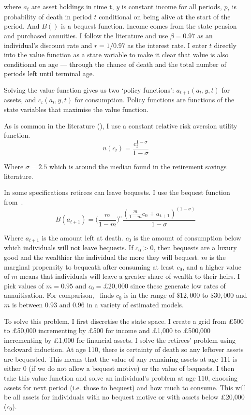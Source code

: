 \documentclass[12pt]{article}
\begin{document}
where $a_{t}$ are asset holdings in time t, $y$ is constant income for all
periods, $p_{t}$ is probability of death in period $t$ conditional on being
alive at the start of the period. And $B()$ is a bequest function. Income comes
from the state pension and purchased annuities. I follow the literature and use
$\beta = 0.97$ as an individual's discount rate and $r = 1/0.97$ as the interest
rate. I enter $t$ directly into the value function as a state variable to make
it clear that value is also conditional on age --- through the chance of death
and the total number of periods left until terminal age.

Solving the value function gives us two `policy functions': $a_{t+1}(a_{t},
  y,t)$ for assets, and $c_{t}(a_{t}, y, t)$ for consumption. Policy
functions are functions of the state variables that maximise the value function.

As is common in the literature (\cite{lockwood-red-2012,de-nardi-et-al-2010}), I
use a constant relative risk aversion utility function.
\begin{equation*}
  \label{eq:utility}
  u(c_{t}) = \frac{c_{t}^{1 - \sigma}}{1 - \sigma}
\end{equation*}

Where $\sigma = 2.5$ which is around the median found in the retirement savings
literature.

In some specifications retirees can leave bequests. I use the bequest function
from~\cite{lockwood-red-2012,lockwood-aer-2018}.
\begin{equation*}
  \label{eq:bequest-function}
  B(a_{t+1}) = \bigl( \frac{m}{1 - m} \bigr)^{\sigma}  \frac{(\frac{m}{1 - m}c_{0} + a_{t+1})^{(1 - \sigma)}}{1 - \sigma}
\end{equation*}

Where $a_{t+1}$ is the amount left at death. $c_{0}$ is the amount of
consumption below which individuals will not leave bequests. If $c_{0} >0$, then
bequests are a luxury good and the wealthier the individual the more they will
bequest. $m$ is the marginal propensity to bequeath after consuming at least
$c_{0}$, and a higher value of $m$ means that individuals will leave a greater
share of wealth to their heirs. I pick values of $m = 0.95$ and $c_{0} = \pounds
  20,000$ since these generate low rates of annuitisation. For comparison,~\cite{lockwood-aer-2018} finds $c_{0}$ is in the range of $\$12,000$ to
$\$30,000$ and $m$ is between $0.93$ and $0.96$ in a variety of estimated
models.

To solve this problem, I first discretise the state space. I create a grid from £500
to £50,000 incrementing by £500 for income and £1,000 to £500,000 incrementing
by £1,000 for financial assets. I solve the retirees' problem using backward
induction. At age 110, there is certainty of death so any leftover assets are
bequested. This means that the value of any remaining assets at age 111 is either 0 (if we do
not allow a bequest motive) or the value of bequests. I then take this value
function and solve an individual's problem at age 110, choosing assets for next
period (i.e. those to bequest) and how much to consume. This will be all assets
for individuals with no bequest motive or with assets below £20,000 ($c_{0}$).
\end{document}
